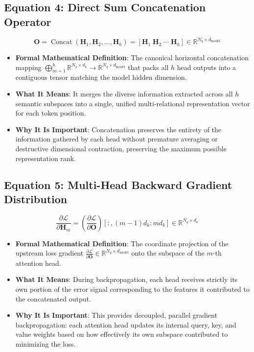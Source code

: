 \documentclass[11pt,a4paper]{article}
\theoremstyle{definition}
\begin{document}
\subsection{\textbf{Equation 4: Direct Sum Concatenation Operator}}
{\boldmath
\begin{equation}
\mathbf{O} = \operatorname{Concat}(\mathbf{H}_1, \mathbf{H}_2, \dots, \mathbf{H}_h) = \left[ \mathbf{H}_1 \; \mathbf{H}_2 \; \cdots \; \mathbf{H}_h \right] \in \mathbb{R}^{N_q \times d_{\text{model}}}
\end{equation}
}
\begin{itemize}
    \item \textbf{Formal Mathematical Definition}:
    The canonical horizontal concatenation mapping $\bigoplus_{m=1}^h \mathbb{R}^{N_q \times d_k} \to \mathbb{R}^{N_q \times d_{\text{model}}}$ that packs all $h$ head outputs into a contiguous tensor matching the model hidden dimension.
    \item \textbf{What It Means}:
    It merges the diverse information extracted across all $h$ semantic subspaces into a single, unified multi-relational representation vector for each token position.
    \item \textbf{Why It Is Important}:
    Concatenation preserves the entirety of the information gathered by each head without premature averaging or destructive dimensional contraction, preserving the maximum possible representation rank.
\end{itemize}

\subsection{\textbf{Equation 5: Multi-Head Backward Gradient Distribution}}
{\boldmath
\begin{equation}
\frac{\partial \mathcal{L}}{\partial \mathbf{H}_m} = \left(\frac{\partial \mathcal{L}}{\partial \mathbf{O}}\right)[:, (m-1)d_k : m d_k] \in \mathbb{R}^{N_q \times d_k}
\end{equation}
}
\begin{itemize}
    \item \textbf{Formal Mathematical Definition}:
    The coordinate projection of the upstream loss gradient $\frac{\partial \mathcal{L}}{\partial \mathbf{O}} \in \mathbb{R}^{N_q \times d_{\text{model}}}$ onto the subspace of the $m$-th attention head.
    \item \textbf{What It Means}:
    During backpropagation, each head receives strictly its own portion of the error signal corresponding to the features it contributed to the concatenated output.
    \item \textbf{Why It Is Important}:
    This provides decoupled, parallel gradient backpropagation: each attention head updates its internal query, key, and value weights based on how effectively its own subspace contributed to minimizing the loss.
\end{itemize}
\end{document}
